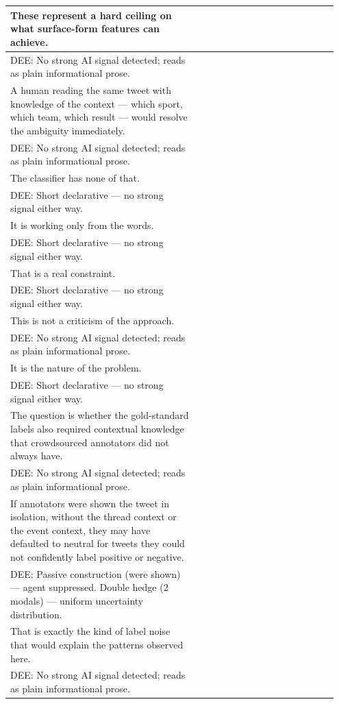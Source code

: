 \documentclass[11pt]{article}
\begin{document}
\begin{longtable}{|p{0.55\linewidth}|p{0.40\linewidth}|}
\hline
These represent a hard ceiling on what surface-form features can achieve. & \\[2pt]
\hline
DEE: No strong AI signal detected; reads as plain informational prose. & \\
\hline
A human reading the same tweet with knowledge of the context --- which sport, which team, which result --- would resolve the ambiguity immediately. & \\[2pt]
\hline
DEE: No strong AI signal detected; reads as plain informational prose. & \\
\hline
The classifier has none of that. & \\[2pt]
\hline
DEE: Short declarative --- no strong signal either way. & \\
\hline
It is working only from the words. & \\[2pt]
\hline
DEE: Short declarative --- no strong signal either way. & \\
\hline
That is a real constraint. & \\[2pt]
\hline
DEE: Short declarative --- no strong signal either way. & \\
\hline
This is not a criticism of the approach. & \\[2pt]
\hline
DEE: No strong AI signal detected; reads as plain informational prose. & \\
\hline
It is the nature of the problem. & \\[2pt]
\hline
DEE: Short declarative --- no strong signal either way. & \\
\hline
The question is whether the gold-standard labels also required contextual knowledge that crowdsourced annotators did not always have. & \\[2pt]
\hline
DEE: No strong AI signal detected; reads as plain informational prose. & \\
\hline
If annotators were shown the tweet in isolation, without the thread context or the event context, they may have defaulted to neutral for tweets they could not confidently label positive or negative. & \\[2pt]
\hline
DEE: Passive construction (were shown) --- agent suppressed. Double hedge (2 modals) --- uniform uncertainty distribution. & \\
\hline
That is exactly the kind of label noise that would explain the patterns observed here. & \\[2pt]
\hline
DEE: No strong AI signal detected; reads as plain informational prose. & \\

\end{longtable}
\end{document}

